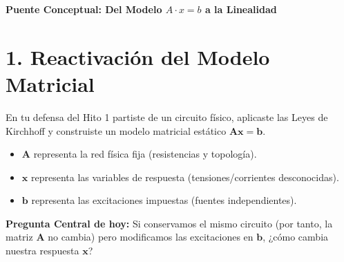 \documentclass[11pt, a4paper]{article}
\begin{document}
\begin{tcolorbox}[colback=ucbblue!5!white, colframe=ucbblue, title=\textbf{Micro-Lección Asincrónica: ¿Qué pasa si cambia la excitación?}]
    \centering \large \textbf{Puente Conceptual: Del Modelo $A\cdot x = b$ a la Linealidad}
\end{tcolorbox}

\section*{1. Reactivación del Modelo Matricial}
En tu defensa del Hito 1 partiste de un circuito físico, aplicaste las Leyes de Kirchhoff y construiste un modelo matricial estático $\bm{A} \bm{x} = \bm{b}$. 
\begin{itemize}
    \item $\bm{A}$ representa la red física fija (resistencias y topología).
    \item $\bm{x}$ representa las variables de respuesta (tensiones/corrientes desconocidas).
    \item $\bm{b}$ representa las excitaciones impuestas (fuentes independientes).
\end{itemize}

\begin{tcolorbox}[colback=white, colframe=black, boxrule=0.5pt, arc=1mm]
\textbf{Pregunta Central de hoy:} Si conservamos el mismo circuito (por tanto, la matriz $\bm{A}$ no cambia) pero modificamos las excitaciones en $\bm{b}$, ¿cómo cambia nuestra respuesta $\bm{x}$?
\end{tcolorbox}
\end{document}
